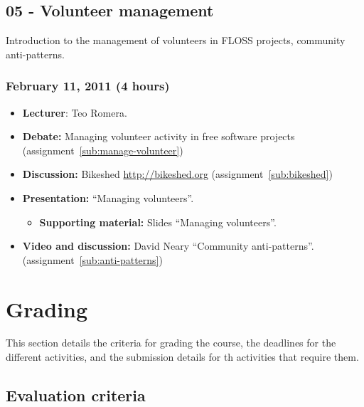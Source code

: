 \documentclass[a4paper]{article}
\begin{document}
\subsection{05 - Volunteer management}

Introduction to the management of volunteers in FLOSS projects, community anti-patterns.

\subsubsection{February 11, 2011 (4 hours)}

\begin{itemize}
\item \textbf{Lecturer}: Teo Romera.
\item \textbf{Debate:} Managing volunteer activity in free software projects (assignment~\ref{sub:manage-volunteer})
\item \textbf{Discussion:} Bikeshed \url{http://bikeshed.org} (assignment~\ref{sub:bikeshed})
\item \textbf{Presentation:} ``Managing volunteers''.
  \begin{itemize}
  \item \textbf{Supporting material:} Slides ``Managing volunteers''.
  \end{itemize}
\item \textbf{Video and discussion:} David Neary ``Community anti-patterns''. (assignment~\ref{sub:anti-patterns})
\end{itemize}


\section{Grading}


This section details the criteria for grading the course, the deadlines for the different activities, and the submission details for th activities that require them.

\subsection{Evaluation criteria}
\label{sub:evaluation-criteria}
\end{document}
